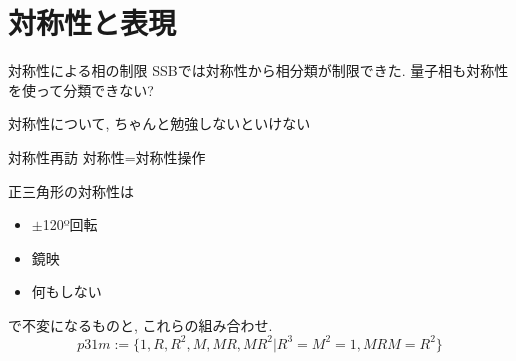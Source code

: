 \documentclass[dvipdfm]{beamer}
\begin{document}
\section{対称性と表現}

\begin{frame}{対称性による相の制限}
    SSBでは対称性から相分類が制限できた. 
    量子相も対称性を使って分類できない?

    対称性について, ちゃんと勉強しないといけない
\end{frame}

\begin{frame}{対称性再訪}
    対称性=対称性操作
    \begin{figure}
        \centering
        \begin{minipage}{0.45\linewidth}
            \centering
        \end{minipage}
        \begin{minipage}{0.45\linewidth}
            \centering
        \end{minipage}
    \end{figure}
    正三角形の対称性は
    \begin{itemize}
        \item $\pm$120º回転
        \item 鏡映
        \item 何もしない
    \end{itemize}
    で不変になるものと, これらの組み合わせ. 
    \begin{equation*}
        p31m:=\{1, R, R^2, M, MR, MR^2 | R^3=M^2=1, MRM=R^2\}
    \end{equation*}
\end{frame}
\end{document}
